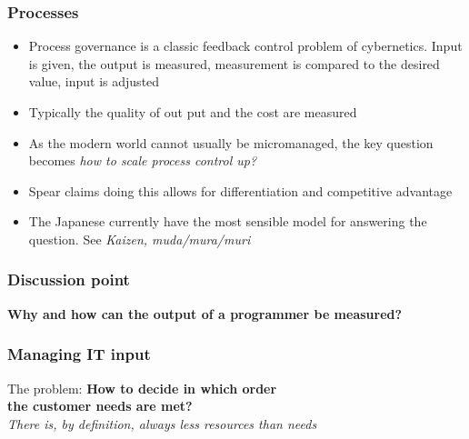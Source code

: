 \begin{frame}[fragile]
  \frametitle{Processes}
	\begin{itemize}
		\item Process governance is a classic feedback control problem of cybernetics. Input is given, the output is measured, measurement is compared to the desired value, input is adjusted
		\item Typically the quality of out put and the cost are measured
		\item As the modern world cannot usually be micromanaged, the key question becomes \emph{how to scale process control up?} 
		\item Spear \citep{spear2010high} claims doing this allows for differentiation and competitive advantage
		\item The Japanese currently have the most sensible model for answering the question. See \emph{Kaizen, muda/mura/muri}
	\end{itemize}
\end{frame}


\begin{frame}[fragile]
  \frametitle{Discussion point}
		\begin{center}
			\textbf{Why and how can the output of a programmer be measured?}
		\end{center}
\end{frame}

\begin{frame}[fragile]
  \frametitle{Managing IT input}
  \begin{center}
	  The problem: \textbf{How to decide in which order\\ the customer needs are met?}
		\\[3mm]
	\emph{There is, by definition, always less resources than needs}
  \end{center}
\end{frame}
    
